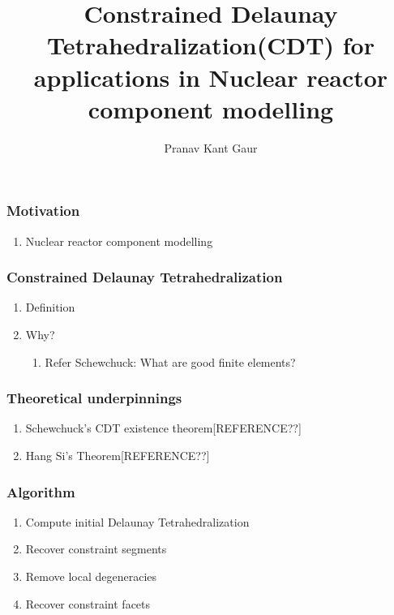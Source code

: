 \documentclass{beamer}
\title[CDT]{Constrained Delaunay Tetrahedralization(CDT) for applications in Nuclear reactor component modelling}
\author{Pranav Kant Gaur}
\institute[BARC, Mumbai]{Computer Division, \newline Bhabha Atomic Research Centre, Mumbai, India}
\date{}
\begin{document}
	\begin{frame}
		\titlepage
	\end{frame}	
	\begin{frame}
	\frametitle{Motivation}
		\begin{enumerate}
			\item Nuclear reactor component modelling	
		\end{enumerate}
	\end{frame}
	\begin{frame}
		\frametitle{Constrained Delaunay Tetrahedralization}
			\begin{enumerate}
				\item Definition		
				\item Why?
					\begin{enumerate}
						\item Refer Schewchuck: What are good finite elements?		
					\end{enumerate}		
			\end{enumerate}		
	\end{frame}	
	\begin{frame}
		\frametitle{Theoretical underpinnings}
			\begin{enumerate}
				\item	Schewchuck's CDT existence theorem[REFERENCE??]
				\item	Hang Si's Theorem[REFERENCE??]
			\end{enumerate}		
	\end{frame}	
	\begin{frame}
		\frametitle{Algorithm} 
			\begin{enumerate}
				\item Compute initial Delaunay Tetrahedralization	
				\item Recover constraint segments
				\item Remove local degeneracies
				\item Recover constraint facets
			\end{enumerate}		
	\end{frame}
\end{document}
